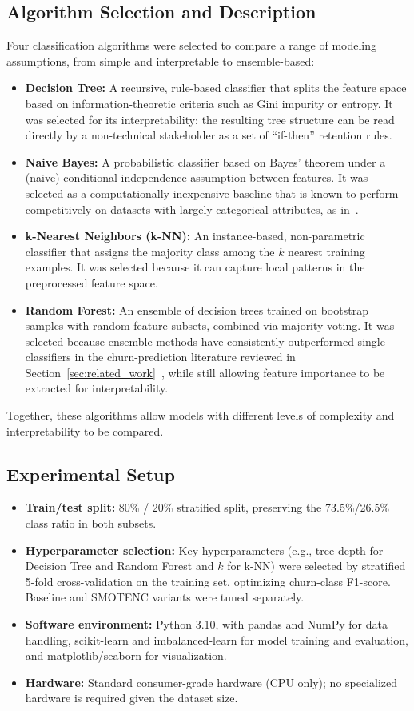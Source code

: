 \documentclass[conference]{IEEEtran}
\begin{document}
	\subsection{Algorithm Selection and Description}
	Four classification algorithms were selected to compare a range of modeling assumptions, from simple and interpretable to ensemble-based:
	\begin{itemize}
		\item \textbf{Decision Tree:} A recursive, rule-based classifier that splits the feature space based on information-theoretic criteria such as Gini impurity or entropy. It was selected for its interpretability: the resulting tree structure can be read directly by a non-technical stakeholder as a set of ``if-then'' retention rules.
		\item \textbf{Naive Bayes:} A probabilistic classifier based on Bayes' theorem under a (naive) conditional independence assumption between features. It was selected as a computationally inexpensive baseline that is known to perform competitively on datasets with largely categorical attributes, as in~\cite{b2}.
		\item \textbf{k-Nearest Neighbors (k-NN):} An instance-based, non-parametric classifier that assigns the majority class among the $k$ nearest training examples. It was selected because it can capture local patterns in the preprocessed feature space.
		\item \textbf{Random Forest:} An ensemble of decision trees trained on bootstrap samples with random feature subsets, combined via majority voting. It was selected because ensemble methods have consistently outperformed single classifiers in the churn-prediction literature reviewed in Section~\ref{sec:related_work}~\cite{b1,b3}, while still allowing feature importance to be extracted for interpretability.
	\end{itemize}
	Together, these algorithms allow models with different levels of complexity and interpretability to be compared.
	
	\subsection{Experimental Setup}
	\begin{itemize}
		\item \textbf{Train/test split:} 80\% / 20\% stratified split, preserving the 73.5\%/26.5\% class ratio in both subsets.
		\item \textbf{Hyperparameter selection:} Key hyperparameters (e.g., tree depth for Decision Tree and Random Forest and $k$ for k-NN) were selected by stratified 5-fold cross-validation on the training set, optimizing churn-class F1-score. Baseline and SMOTENC variants were tuned separately.
		\item \textbf{Software environment:} Python 3.10, with pandas and NumPy for data handling, scikit-learn and imbalanced-learn for model training and evaluation, and matplotlib/seaborn for visualization.
		\item \textbf{Hardware:} Standard consumer-grade hardware (CPU only); no specialized hardware is required given the dataset size.
	\end{itemize}
	
\end{document}
